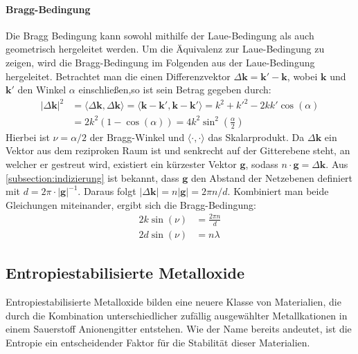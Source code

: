 \paragraph{Bragg-Bedingung}
Die Bragg Bedingung kann sowohl mithilfe der Laue-Bedingung als auch geometrisch hergeleitet werden.
Um die Äquivalenz zur Laue-Bedingung zu zeigen, wird die Bragg-Bedingung im Folgenden aus der Laue-Bedingung
hergeleitet.
Betrachtet man die einen Differenzvektor $\Delta \mathbf{k}=\mathbf{k}'-\mathbf{k}$, wobei $\mathbf{k}$ und
$\mathbf{k'}$ den Winkel $\alpha$ einschließen,so ist sein Betrag gegeben durch:
\begin{align}
    \lvert \Delta \mathbf{k} \rvert ^{2}&=\langle \Delta \mathbf{k} ,\Delta \mathbf{k}\rangle =\langle \mathbf{k}-\mathbf{k}', \mathbf{k}-\mathbf{k}' \rangle = k^{2}+k'^{2}-2kk'\cos(\alpha)  \\
    &=2{k}^{2}(1-\cos(\alpha))=4k^{2}\sin ^{2}\left( \frac{\alpha}{2} \right)
\end{align}
Hierbei ist $\nu = \alpha / 2$ der Bragg-Winkel und $\langle \cdot , \cdot \rangle$ das Skalarprodukt.
Da $\Delta \mathbf{k}$ ein Vektor aus dem reziproken Raum ist und senkrecht auf der Gitterebene
steht, an welcher er gestreut wird, existiert ein kürzester Vektor $\mathbf{g}$, sodass
$n\cdot \mathbf{g} =\Delta \mathbf{k}$.
Aus \cref{subsection:indizierung} ist bekannt, dass $\mathbf{g}$ den Abstand der Netzebenen definiert
mit $d = 2 \pi \cdot\lvert \mathbf{g} \rvert ^{-1}$.
Daraus folgt $\lvert \Delta \mathbf{k} \rvert=n \lvert \mathbf{g} \rvert = 2\pi n/d$.
Kombiniert man beide Gleichungen miteinander, ergibt sich die Bragg-Bedingung:
\begin{align}
    2k\sin(\nu)&=\frac{2\pi n}{d} \\
    2d\sin(\nu)&=n \lambda
\end{align}

\subsection{Entropiestabilisierte Metalloxide}\label{subsec:hochentropische-metalloxide}
Entropiestabilisierte Metalloxide bilden eine neuere Klasse von Materialien, die durch die Kombination unterschiedlicher
zufällig ausgewählter Metallkationen in einem Sauerstoff Anionengitter entstehen.
Wie der Name bereits andeutet, ist die Entropie ein entscheidender Faktor für die Stabilität dieser Materialien.